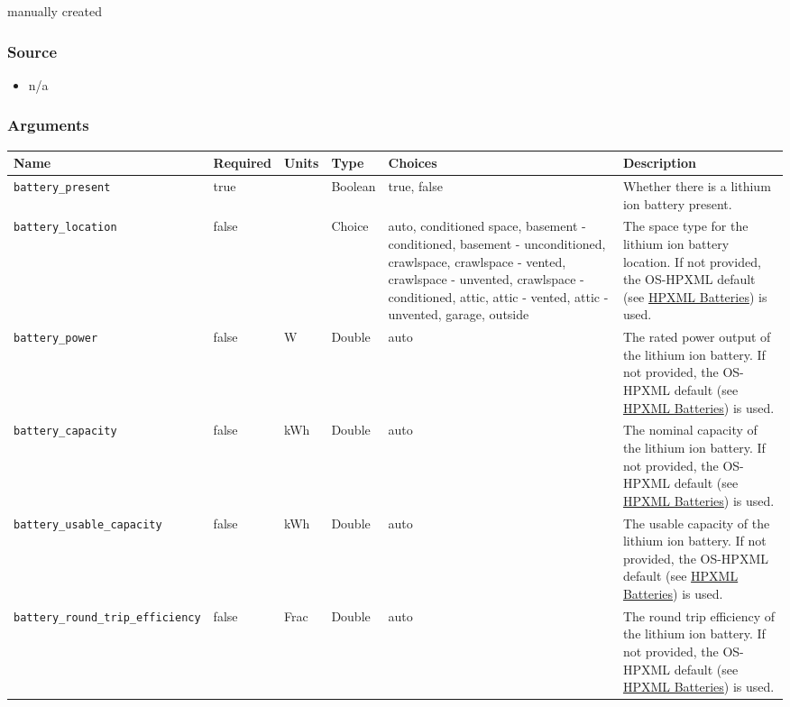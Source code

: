 manually created

\subsubsection{Source}\label{source-6}

\begin{itemize}
 
\item
  n/a
\end{itemize}

\subsubsection{Arguments}\label{arguments-2}

\begin{longtable}[]{@{}llllll@{}}
\toprule\noalign{}
Name & Required & Units & Type & Choices & Description \\
\midrule\noalign{}
\endhead
\bottomrule\noalign{}
\endlastfoot
\texttt{battery\_present} & true & & Boolean & true, false & Whether
there is a lithium ion battery present. \\
\texttt{battery\_location} & false & & Choice & auto, conditioned space,
basement - conditioned, basement - unconditioned, crawlspace, crawlspace
- vented, crawlspace - unvented, crawlspace - conditioned, attic, attic
- vented, attic - unvented, garage, outside & The space type for the
lithium ion battery location. If not provided, the OS-HPXML default (see
\href{https://openstudio-hpxml.readthedocs.io/en/v1.7.0/workflow_inputs.html\#hpxml-batteries}{HPXML
Batteries}) is used. \\
\texttt{battery\_power} & false & W & Double & auto & The rated power
output of the lithium ion battery. If not provided, the OS-HPXML default
(see
\href{https://openstudio-hpxml.readthedocs.io/en/v1.7.0/workflow_inputs.html\#hpxml-batteries}{HPXML
Batteries}) is used. \\
\texttt{battery\_capacity} & false & kWh & Double & auto & The nominal
capacity of the lithium ion battery. If not provided, the OS-HPXML
default (see
\href{https://openstudio-hpxml.readthedocs.io/en/v1.7.0/workflow_inputs.html\#hpxml-batteries}{HPXML
Batteries}) is used. \\
\texttt{battery\_usable\_capacity} & false & kWh & Double & auto & The
usable capacity of the lithium ion battery. If not provided, the
OS-HPXML default (see
\href{https://openstudio-hpxml.readthedocs.io/en/v1.7.0/workflow_inputs.html\#hpxml-batteries}{HPXML
Batteries}) is used. \\
\texttt{battery\_round\_trip\_efficiency} & false & Frac & Double & auto
& The round trip efficiency of the lithium ion battery. If not provided,
the OS-HPXML default (see
\href{https://openstudio-hpxml.readthedocs.io/en/v1.7.0/workflow_inputs.html\#hpxml-batteries}{HPXML
Batteries}) is used. \\
\end{longtable}

